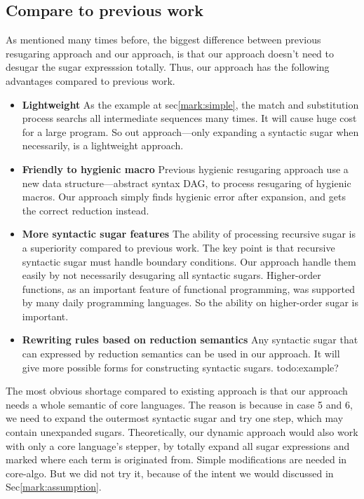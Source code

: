 				
\subsection{Compare to previous work}

As mentioned many times before, the biggest difference between previous resugaring approach and our approach, is that our approach doesn't need to desugar the sugar expresssion totally. Thus, our approach has the following advantages compared to previous work.

\begin{itemize}
	\item {\bfseries Lightweight} As the example at sec\ref{mark:simple}, the match and substitution process searchs all intermediate sequences many times. It will cause huge cost for a large program. So out approach---only expanding a syntactic sugar when necessarily, is a lightweight approach.
	\item {\bfseries Friendly to hygienic macro} Previous hygienic resugaring approach use a new data structure---abstract syntax DAG, to process resugaring of hygienic macros. Our approach simply finds hygienic error after expansion, and gets the correct reduction instead.
	\item {\bfseries More syntactic sugar features} The ability of processing recursive sugar is a superiority compared to previous work. The key point is that recursive syntactic sugar must handle boundary conditions. Our approach handle them easily by not necessarily desugaring all syntactic sugars. Higher-order functions, as an important feature of functional programming, was supported by many daily programming languages. So the ability on higher-order sugar is important.
	\item {\bfseries Rewriting rules based on reduction semantics} Any syntactic sugar that can expressed by reduction semantics can be used in our approach. It will give more possible forms for constructing syntactic sugars. todo:example?
\end{itemize}

The most obvious shortage compared to existing approach is that our approach needs a whole semantic of core languages. The reason is because in case 5 and 6, we need to expand the outermost syntactic sugar and try one step, which may contain unexpanded sugars. Theoretically, our dynamic approach would also work with only a core language's stepper, by totally expand all sugar expressions and marked where each term is originated from. Simple modifications are needed in core-algo. But we did not try it, because of the intent we would discussed in Sec\ref{mark:assumption}.